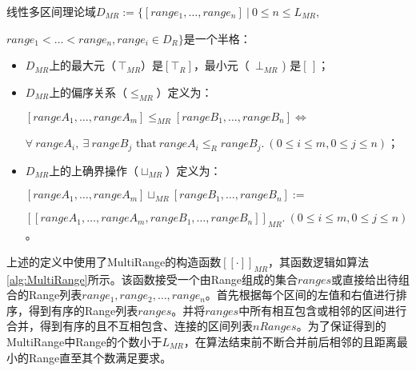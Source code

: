 \begin{definition}
	线性多区间理论域$ D_{MR}  := \{ [range_1, \dots, range_n] \ | \ 0 \le n \le L_{MR},  $
	
	$range_1 < \dots < range_n, range_i \in D_R\}$是一个半格：
	\begin{itemize}
		\item $ D_{MR} $上的最大元（$\, \top_{MR} $）是$ [\top_R] $，最小元（\, $ \bot_{MR} $ ) 是$ [\,] $；
		
		\item $ D_{MR} $上的偏序关系（$ \le_{MR} $）定义为：\\
			\centerline{$[rangeA_1, \dots, rangeA_m] \le_{MR} [rangeB_1, \dots, rangeB_n] \iff$}
			\centerline{$ \forall \ rangeA_i, \ \exists\  rangeB_j \text{ that} \ rangeA_i \le_R rangeB_j .\  (0 \le i \le m, 0 \le j \le n)$；}
			
		\item $ D_{MR} $上的上确界操作（$ \sqcup_{MR} $）定义为：\\
			\centerline{$ [rangeA_1, \dots, rangeA_m] \sqcup_{MR} [rangeB_1, \dots, rangeB_n]  := $}
			\centerline{$ [[rangeA_1, \dots, rangeA_m, rangeB_1, \dots, rangeB_n]]_{MR} .\  (0 \le i \le m, 0 \le j \le n)$。}
	\end{itemize}
	
\end{definition}

上述的定义中使用了MultiRange的构造函数$ [[\cdot]]_{MR} $，其函数逻辑如算法\ref{alg:MultiRange}所示。该函数接受一个由Range组成的集合$ ranges $或直接给出待组合的Range列表$ range_1, range_2, \dots, range_n $。首先根据每个区间的左值和右值进行排序，得到有序的Range列表$ ranges $。并将$ ranges $中所有相互包含或相邻的区间进行合并，得到有序的且不互相包含、连接的区间列表$ nRanges $。为了保证得到的MultiRange中Range的个数小于$ L_{MR} $，在算法结束前不断合并前后相邻的且距离最小的Range直至其个数满足要求。

